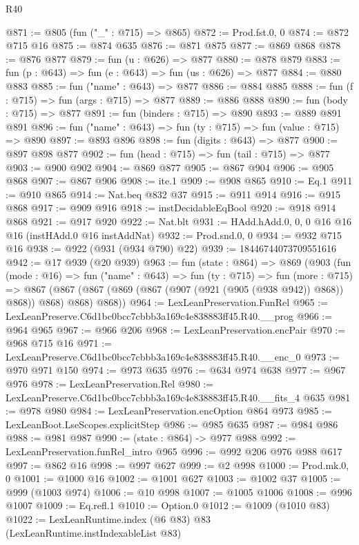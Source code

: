 \begin{lexlean}{R40}
\begin{coremodule}
@871 := @805 (fun ("_" : @715) => @865)
@872 := Prod.fst.{0, 0}
@874 := @872 @715 @16
@875 := @874 @635
@876 := @871 @875
@877 := @869 @868
@878 := @876 @877
@879 := fun (u : @626) => @877
@880 := @878 @879
@883 := fun (p : @643) => fun (e : @643) => fun (us : @626) => @877
@884 := @880 @883
@885 := fun ("name" : @643) => @877
@886 := @884 @885
@888 := fun (f : @715) => fun (args : @715) => @877
@889 := @886 @888
@890 := fun (body : @715) => @877
@891 := fun (binders : @715) => @890
@893 := @889 @891 @891
@896 := fun ("name" : @643) => fun (ty : @715) => fun (value : @715) => @890
@897 := @893 @896
@898 := fun (digits : @643) => @877
@900 := @897 @898 @877
@902 := fun (head : @715) => fun (tail : @715) => @877
@903 := @900 @902
@904 := @869 @877
@905 := @867 @904
@906 := @905 @868
@907 := @867 @906
@908 := ite.{1}
@909 := @908 @865
@910 := Eq.{1}
@911 := @910 @865
@914 := Nat.beq @832 @37
@915 := @911 @914
@916 := @915 @868
@917 := @909 @916
@918 := instDecidableEqBool
@920 := @918 @914 @868
@921 := @917 @920
@922 := Nat.blt
@931 := HAdd.hAdd.{0, 0, 0} @16 @16 @16 (instHAdd.{0} @16 instAddNat)
@932 := Prod.snd.{0, 0}
@934 := @932 @715 @16
@938 := @922 (@931 (@934 @790) @22)
@939 := 18446744073709551616
@942 := @17 @939 (@20 @939)
@963 := fun (state : @864) =>
  @869
    (@903
      (fun (mode : @16) =>
      fun ("name" : @643) =>
      fun (ty : @715) =>
      fun (more : @715) =>
      @867 (@867 (@867 (@869 (@867 (@907 (@921 (@905 (@938 @942)) @868)) @868)) @868) @868) @868))
@964 := LexLeanPreservation.FunRel
@965 := LexLeanPreserve.C6d1bc0bcc7cbbb3a169c4e838883ff45.R40.__prog
@966 := @964 @965
@967 := @966 @206
@968 := LexLeanPreservation.encPair
@970 := @968 @715 @16
@971 := LexLeanPreserve.C6d1bc0bcc7cbbb3a169c4e838883ff45.R40.__enc_0
@973 := @970 @971 @150
@974 := @973 @635
@976 := @634 @974 @638
@977 := @967 @976
@978 := LexLeanPreservation.Rel
@980 := LexLeanPreserve.C6d1bc0bcc7cbbb3a169c4e838883ff45.R40.__fits_4 @635
@981 := @978 @980
@984 := LexLeanPreservation.encOption @864 @973
@985 := LexLeanBoot.LseScopes.explicitStep
@986 := @985 @635
@987 := @984 @986
@988 := @981 @987
@990 := (state : @864) -> @977 @988
@992 := LexLeanPreservation.funRel_intro @965
@996 := @992 @206 @976 @988 @617
@997 := @862 @16
@998 := @997 @627
@999 := @2 @998
@1000 := Prod.mk.{0, 0}
@1001 := @1000 @16
@1002 := @1001 @627
@1003 := @1002 @37
@1005 := @999 (@1003 @974)
@1006 := @10 @998
@1007 := @1005 @1006
@1008 := @996 @1007
@1009 := Eq.refl.{1}
@1010 := Option.{0}
@1012 := @1009 (@1010 @83)
@1022 := LexLeanRuntime.index
    (@6 @83)
    @83
    (LexLeanRuntime.instIndexableList @83)

\end{coremodule}
\end{lexlean}
